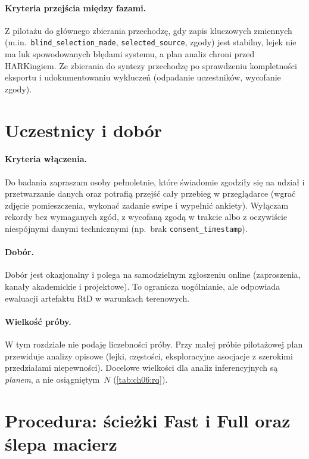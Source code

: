 \paragraph{Kryteria przejścia między fazami.}
Z pilotażu do głównego zbierania przechodzę, gdy zapis kluczowych zmiennych (m.in.\ \texttt{blind\_selection\_made}, \texttt{selected\_source}, zgody) jest stabilny, lejek nie ma luk spowodowanych błędami systemu, a plan analiz chroni przed HARKingiem. Ze zbierania do syntezy przechodzę po sprawdzeniu kompletności eksportu i udokumentowaniu wykluczeń (odpadanie uczestników, wycofanie zgody).

\section{Uczestnicy i dobór}
\label{ch06:sec:uczestnicy}

\paragraph{Kryteria włączenia.}
Do badania zapraszam osoby pełnoletnie, które świadomie zgodziły się na udział i przetwarzanie danych oraz potrafią przejść cały przebieg w przeglądarce (wgrać zdjęcie pomieszczenia, wykonać zadanie swipe i wypełnić ankiety). Wyłączam rekordy bez wymaganych zgód, z wycofaną zgodą w trakcie albo z oczywiście niespójnymi danymi technicznymi (np.\ brak \texttt{consent\_timestamp}).

\paragraph{Dobór.}
Dobór jest okazjonalny i polega na samodzielnym zgłoszeniu online (zaproszenia, kanały akademickie i projektowe). To ogranicza uogólnianie, ale odpowiada ewaluacji artefaktu RtD w warunkach terenowych.

\paragraph{Wielkość próby.}
W tym rozdziale nie podaję liczebności próby. Przy małej próbie pilotażowej plan przewiduje analizy opisowe (lejki, częstości, eksploracyjne asocjacje z szerokimi przedziałami niepewności). Docelowe wielkości dla analiz inferencyjnych są \emph{planem}, a nie osiągniętym~$N$ (\cref{tab:ch06:rq}).

\section{Procedura: ścieżki Fast i Full oraz ślepa macierz}
\label{ch06:sec:procedura}


